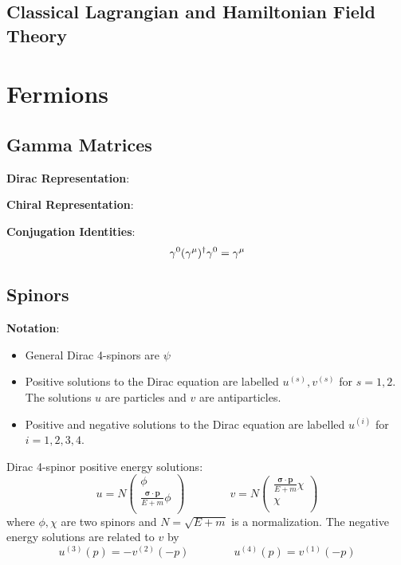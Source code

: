 \documentclass[12pt]{article}
\theoremstyle{definition}
\begin{document}
\subsection{Classical Lagrangian and Hamiltonian Field Theory}

\section{Fermions}

\subsection{Gamma Matrices}

\textbf{Dirac Representation}:

\textbf{Chiral Representation}:

\textbf{Conjugation Identities}:
\begin{equation*}
    \gamma^0 (\gamma^\mu)^\dagger \gamma^0 = \gamma^\mu \\
\end{equation*}


\subsection{Spinors}

\textbf{Notation}:
\begin{itemize}
    \item General Dirac 4-spinors are $\psi$
    \item Positive solutions to the Dirac equation are labelled $u^{(s)},v^{(s)}$ for $s = 1,2$. The
        solutions $u$ are particles and $v$ are antiparticles.
    \item Positive and negative solutions to the Dirac equation are labelled $u^{(i)}$ for $i=1,2,3,4$.
\end{itemize}

Dirac 4-spinor positive energy solutions:
\begin{equation*}
    u = N
    \begin{pmatrix}
        \phi \\
        \frac{\bm{\sigma} \cdot \bm{p}}{E + m} \phi \\
    \end{pmatrix}
    \qquad \qquad
    v = N
    \begin{pmatrix}
        \frac{\bm{\sigma} \cdot \bm{p}}{E + m} \chi \\
        \chi \\
    \end{pmatrix}
\end{equation*}
where $\phi,\chi$ are two spinors and $N = \sqrt{E + m}$ is a normalization. The negative energy solutions are
related to $v$ by
\begin{equation*}
    u^{(3)}(p) = -v^{(2)}(-p) \qquad \qquad u^{(4)}(p) = v^{(1)}(-p)
\end{equation*}
\end{document}
